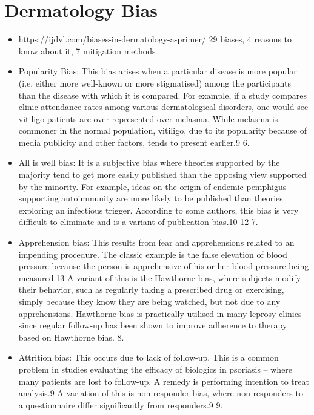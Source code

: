 \documentclass[12pt, a4paper, oneside]{book}   	%
\begin{document}
		\section{Dermatology Bias}
			\begin{itemize}
				\item https://ijdvl.com/biases-in-dermatology-a-primer/ 29 biases, 4 reasons to know about it, 7 mitigation methods \autocite{Chakraborty_2024}
				\item Popularity Bias: This bias arises when a particular disease is more popular (i.e. either more well-known or more stigmatised) among the participants than the disease with which it is compared. For example, if a study compares clinic attendance rates among various dermatological disorders, one would see vitiligo patients are over-represented over melasma. While melasma is commoner in the normal population, vitiligo, due to its popularity because of media publicity and other factors, tends to present earlier.9 6. \autocite{Chakraborty_2024}
				\item All is well bias: It is a subjective bias where theories supported by the majority tend to get more easily published than the opposing view supported by the minority. For example, ideas on the origin of endemic pemphigus supporting autoimmunity are more likely to be published than theories exploring an infectious trigger. According to some authors, this bias is very difficult to eliminate and is a variant of publication bias.10-12 7.\autocite{Chakraborty_2024}
				\item  Apprehension bias: This results from fear and apprehensions related to an impending procedure. The classic example is the false elevation of blood pressure because the person is apprehensive of his or her blood pressure being measured.13 A variant of this is the Hawthorne bias, where subjects modify their behavior, such as regularly taking a prescribed drug or exercising, simply because they know they are being watched, but not due to any apprehensions. Hawthorne bias is practically utilised in many leprosy clinics since regular follow-up has been shown to improve adherence to therapy based on Hawthorne bias. 8. \autocite{Chakraborty_2024}
				\item Attrition bias: This occurs due to lack of follow-up. This is a common problem in studies evaluating the efficacy of biologics in psoriasis – where many patients are lost to follow-up. A remedy is performing intention to treat analysis.9 A variation of this is non-responder bias, where non-responders to a questionnaire differ significantly from responders.9 9. \autocite{Chakraborty_2024}

\end{itemize}
\end{document}
